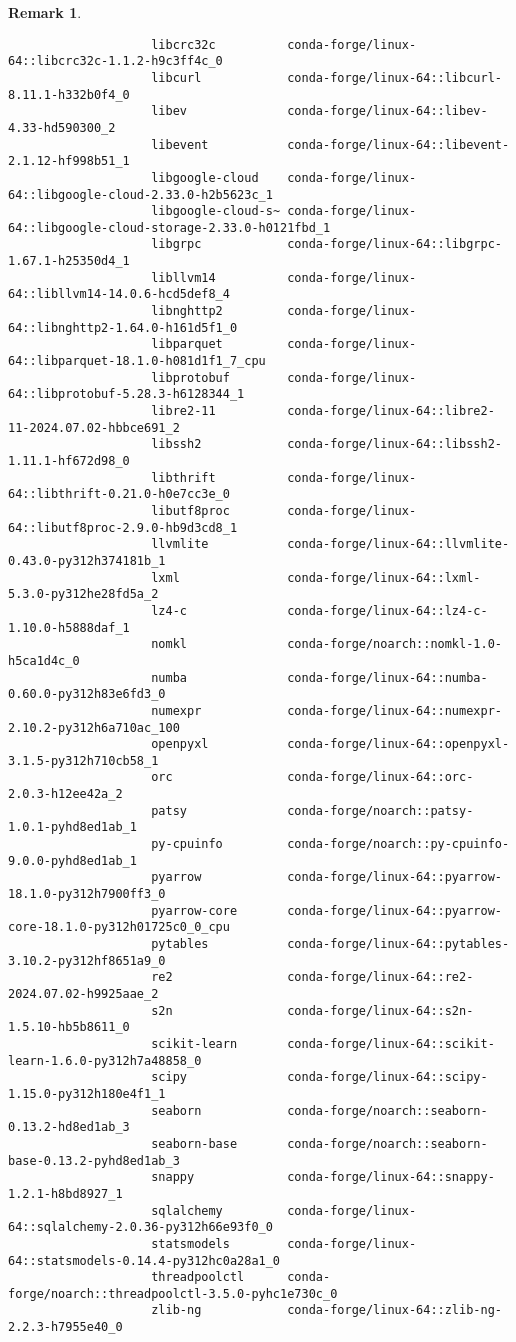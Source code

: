 \documentclass{article}
\newtheorem{remark}{Remark}
\begin{document}
\begin{itemize}
\begin{itemize}
\begin{itemize}
\begin{remark}
\begin{verbatim}
					libcrc32c          conda-forge/linux-64::libcrc32c-1.1.2-h9c3ff4c_0 
					libcurl            conda-forge/linux-64::libcurl-8.11.1-h332b0f4_0 
					libev              conda-forge/linux-64::libev-4.33-hd590300_2 
					libevent           conda-forge/linux-64::libevent-2.1.12-hf998b51_1 
					libgoogle-cloud    conda-forge/linux-64::libgoogle-cloud-2.33.0-h2b5623c_1 
					libgoogle-cloud-s~ conda-forge/linux-64::libgoogle-cloud-storage-2.33.0-h0121fbd_1 
					libgrpc            conda-forge/linux-64::libgrpc-1.67.1-h25350d4_1 
					libllvm14          conda-forge/linux-64::libllvm14-14.0.6-hcd5def8_4 
					libnghttp2         conda-forge/linux-64::libnghttp2-1.64.0-h161d5f1_0 
					libparquet         conda-forge/linux-64::libparquet-18.1.0-h081d1f1_7_cpu 
					libprotobuf        conda-forge/linux-64::libprotobuf-5.28.3-h6128344_1 
					libre2-11          conda-forge/linux-64::libre2-11-2024.07.02-hbbce691_2 
					libssh2            conda-forge/linux-64::libssh2-1.11.1-hf672d98_0 
					libthrift          conda-forge/linux-64::libthrift-0.21.0-h0e7cc3e_0 
					libutf8proc        conda-forge/linux-64::libutf8proc-2.9.0-hb9d3cd8_1 
					llvmlite           conda-forge/linux-64::llvmlite-0.43.0-py312h374181b_1 
					lxml               conda-forge/linux-64::lxml-5.3.0-py312he28fd5a_2 
					lz4-c              conda-forge/linux-64::lz4-c-1.10.0-h5888daf_1 
					nomkl              conda-forge/noarch::nomkl-1.0-h5ca1d4c_0 
					numba              conda-forge/linux-64::numba-0.60.0-py312h83e6fd3_0 
					numexpr            conda-forge/linux-64::numexpr-2.10.2-py312h6a710ac_100 
					openpyxl           conda-forge/linux-64::openpyxl-3.1.5-py312h710cb58_1 
					orc                conda-forge/linux-64::orc-2.0.3-h12ee42a_2 
					patsy              conda-forge/noarch::patsy-1.0.1-pyhd8ed1ab_1 
					py-cpuinfo         conda-forge/noarch::py-cpuinfo-9.0.0-pyhd8ed1ab_1 
					pyarrow            conda-forge/linux-64::pyarrow-18.1.0-py312h7900ff3_0 
					pyarrow-core       conda-forge/linux-64::pyarrow-core-18.1.0-py312h01725c0_0_cpu 
					pytables           conda-forge/linux-64::pytables-3.10.2-py312hf8651a9_0 
					re2                conda-forge/linux-64::re2-2024.07.02-h9925aae_2 
					s2n                conda-forge/linux-64::s2n-1.5.10-hb5b8611_0 
					scikit-learn       conda-forge/linux-64::scikit-learn-1.6.0-py312h7a48858_0 
					scipy              conda-forge/linux-64::scipy-1.15.0-py312h180e4f1_1 
					seaborn            conda-forge/noarch::seaborn-0.13.2-hd8ed1ab_3 
					seaborn-base       conda-forge/noarch::seaborn-base-0.13.2-pyhd8ed1ab_3 
					snappy             conda-forge/linux-64::snappy-1.2.1-h8bd8927_1 
					sqlalchemy         conda-forge/linux-64::sqlalchemy-2.0.36-py312h66e93f0_0 
					statsmodels        conda-forge/linux-64::statsmodels-0.14.4-py312hc0a28a1_0 
					threadpoolctl      conda-forge/noarch::threadpoolctl-3.5.0-pyhc1e730c_0 
					zlib-ng            conda-forge/linux-64::zlib-ng-2.2.3-h7955e40_0 
					

\end{verbatim}
\end{remark}
\end{itemize}
\end{itemize}
\end{itemize}
\end{document}
